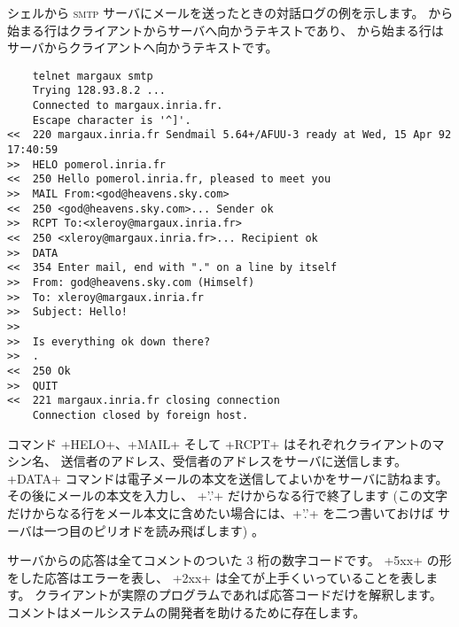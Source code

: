 \begin{example}
シェルから \textsc{smtp} サーバにメールを送ったときの対話ログの例を示します。
\ifhtmlelse{>>}{$\rightarrow$} から始まる行はクライアントからサーバへ向かうテキストであり、
\ifhtmlelse{<<}{$\leftarrow$} から始まる行はサーバからクライアントへ向かうテキストです。
{
\begin{lstlisting}
    telnet margaux smtp
    Trying 128.93.8.2 ...
    Connected to margaux.inria.fr.
    Escape character is '^]'.
<<  220 margaux.inria.fr Sendmail 5.64+/AFUU-3 ready at Wed, 15 Apr 92 17:40:59
>>  HELO pomerol.inria.fr
<<  250 Hello pomerol.inria.fr, pleased to meet you
>>  MAIL From:<god@heavens.sky.com>
<<  250 <god@heavens.sky.com>... Sender ok
>>  RCPT To:<xleroy@margaux.inria.fr>
<<  250 <xleroy@margaux.inria.fr>... Recipient ok
>>  DATA
<<  354 Enter mail, end with "." on a line by itself
>>  From: god@heavens.sky.com (Himself)
>>  To: xleroy@margaux.inria.fr
>>  Subject: Hello!
>>
>>  Is everything ok down there?
>>  .
<<  250 Ok
>>  QUIT
<<  221 margaux.inria.fr closing connection
    Connection closed by foreign host.
\end{lstlisting}}
コマンド \ml+HELO+、\ml+MAIL+ そして \ml+RCPT+ はそれぞれクライアントのマシン名、
送信者のアドレス、受信者のアドレスをサーバに送信します。
\ml+DATA+ コマンドは電子メールの本文を送信してよいかをサーバに訪ねます。
その後にメールの本文を入力し、 \ml+'.'+ だけからなる行で終了します
(この文字だけからなる行をメール本文に含めたい場合には、\ml+'.'+ を二つ書いておけば
サーバは一つ目のピリオドを読み飛ばします) 。

サーバからの応答は全てコメントのついた 3 桁の数字コードです。
\ml+5xx+ の形をした応答はエラーを表し、 \ml+2xx+ は全てが上手くいっていることを表します。
クライアントが実際のプログラムであれば応答コードだけを解釈します。
コメントはメールシステムの開発者を助けるために存在します。
\end{example}

